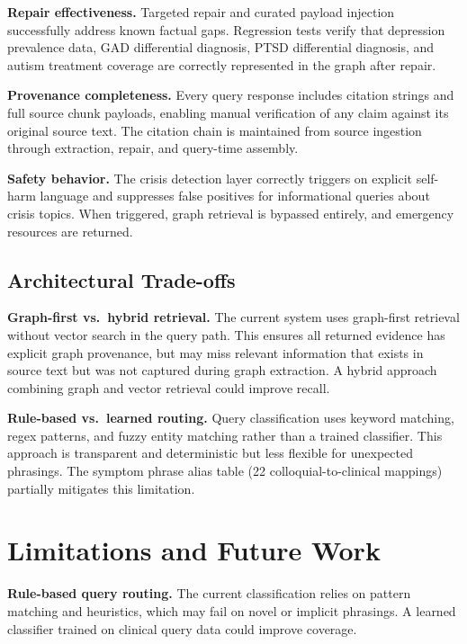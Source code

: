 \documentclass[12pt,a4paper]{article}
\begin{document}
\textbf{Repair effectiveness.} Targeted repair and curated payload injection successfully address known factual gaps. Regression tests verify that depression prevalence data, GAD differential diagnosis, PTSD differential diagnosis, and autism treatment coverage are correctly represented in the graph after repair.

\textbf{Provenance completeness.} Every query response includes citation strings and full source chunk payloads, enabling manual verification of any claim against its original source text. The citation chain is maintained from source ingestion through extraction, repair, and query-time assembly.

\textbf{Safety behavior.} The crisis detection layer correctly triggers on explicit self-harm language and suppresses false positives for informational queries about crisis topics. When triggered, graph retrieval is bypassed entirely, and emergency resources are returned.

\subsection{Architectural Trade-offs}

\textbf{Graph-first vs.\ hybrid retrieval.} The current system uses graph-first retrieval without vector search in the query path. This ensures all returned evidence has explicit graph provenance, but may miss relevant information that exists in source text but was not captured during graph extraction. A hybrid approach combining graph and vector retrieval could improve recall.

\textbf{Rule-based vs.\ learned routing.} Query classification uses keyword matching, regex patterns, and fuzzy entity matching rather than a trained classifier. This approach is transparent and deterministic but less flexible for unexpected phrasings. The symptom phrase alias table (22 colloquial-to-clinical mappings) partially mitigates this limitation.

\section{Limitations and Future Work}

\textbf{Rule-based query routing.} The current classification relies on pattern matching and heuristics, which may fail on novel or implicit phrasings. A learned classifier trained on clinical query data could improve coverage.
\end{document}
